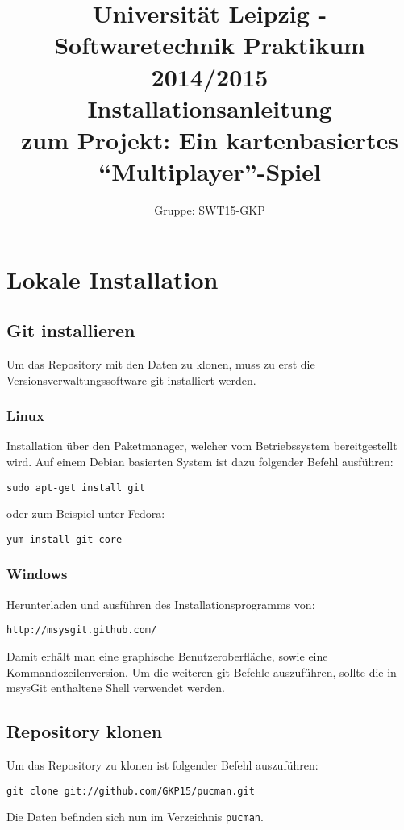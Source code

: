 \documentclass[11pt,a4paper]{article}
\author{Gruppe: SWT15-GKP}
\title{Universität Leipzig - Softwaretechnik Praktikum 2014/2015 \\  Installationsanleitung \\ zum Projekt: Ein kartenbasiertes “Multiplayer”-Spiel}
\begin{document}
\maketitle

\tableofcontents

\clearpage

\section{Lokale Installation}
\subsection{Git installieren}
Um das Repository mit den Daten zu klonen, muss zu erst die Versionsverwaltungssoftware git installiert werden.
\subsubsection{Linux}
Installation über den Paketmanager, welcher vom Betriebssystem bereitgestellt wird.
Auf einem Debian basierten System ist dazu folgender Befehl ausführen:
\begin{lstlisting}
sudo apt-get install git
\end{lstlisting}
oder zum Beispiel unter Fedora:
\begin{lstlisting}
yum install git-core
\end{lstlisting}
\subsubsection{Windows}
Herunterladen und ausführen des Installationsprogramms von:
\begin{lstlisting}
http://msysgit.github.com/
\end{lstlisting}
Damit erhält man eine graphische Benutzeroberfläche, sowie eine Kommandozeilenversion.
Um die weiteren git-Befehle auszuführen, sollte die in msysGit enthaltene Shell verwendet werden.
\subsection{Repository klonen}
Um das Repository zu klonen ist folgender Befehl auszuführen:
\begin{lstlisting}
git clone git://github.com/GKP15/pucman.git
\end{lstlisting}
Die Daten befinden sich nun im Verzeichnis \lstinline$pucman$.
\end{document}
